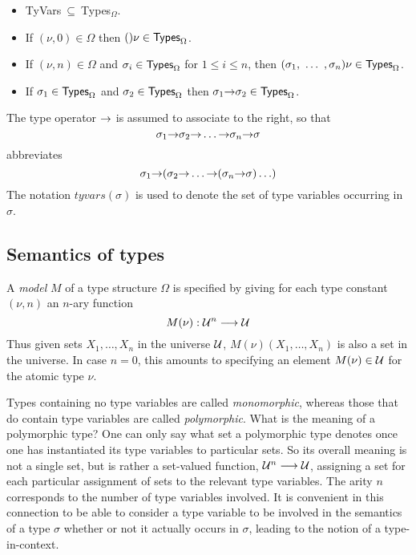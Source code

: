 \begin{itemize}

\item {\sf TyVars}$\ \subseteq\ ${\sf Types}$_{\Omega}$.

\item If $(\nu,0)\in\Omega$ then $()\nu\in{\sf Types}_{\Omega}$.

\item If $(\nu,n)\in\Omega$ and $\sigma_i\in{\sf Types}_{\Omega}$ for
$1\leq i\leq n$, then $(\sigma_1,\ \ldots\ ,\sigma_n)\nu\in{\sf
Types}_{\Omega}$.

\item If $\sigma_1\in{\sf Types}_{\Omega}$ and $\sigma_2\in{\sf
Types}_{\Omega}$ then $\sigma_1{\to}\sigma_2\in{\sf Types}_{\Omega}$.


\end{itemize}
The type operator ${\to}$ is assumed to associate to the
right, so that
\[
\sigma_1{\to}\sigma_2{\to}\ldots{\to} \sigma_n{\to}\sigma
\]
abbreviates
\[
\sigma_1{\to}(\sigma_2{\to}\ldots{\to} (\sigma_n{\to}\sigma)\ldots)
\]
The notation $tyvars(\sigma)$ is used to denote the set of type
variables occurring in $\sigma$.

\subsection{Semantics of types}
\label{semantics of types}


A {\em model} $M$ of a type structure $\Omega$ is specified by giving
for each type constant $(\nu,n)$ an $n$-ary function
\[
M(\nu):{\cal U}^{n}\longrightarrow{\cal U}
\]
Thus given sets $X_1,\ldots,X_n$ in the universe $\cal U$,
$M(\nu)(X_1,\ldots,X_n)$ is also a set in the universe.  In case $n=0$,
this amounts to specifying an element $M(\nu)\in{\cal U}$ for the
atomic type $\nu$.

Types containing no type variables are called {\it monomorphic},
whereas those that do contain type variables are called {\it
polymorphic}. What is the meaning of a polymorphic type? One can
only say what set a polymorphic type denotes once one has instantiated
its type variables to particular sets. So its overall meaning is not a
single set, but is rather a set-valued function, ${\cal
U}^{n}\longrightarrow{\cal U}$, assigning a set for each particular
assignment of sets to the relevant type variables. The arity $n$
corresponds to the number of type variables involved. It is convenient
in this connection to be able to consider a type variable to be
involved in the semantics of a type $\sigma$ whether or not it
actually occurs in $\sigma$, leading to the notion of a
type-in-context.


